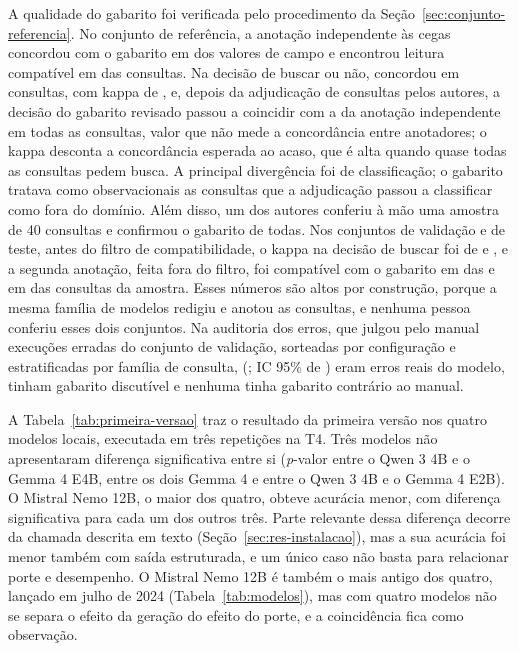 A qualidade do gabarito foi verificada pelo procedimento da Seção~\ref{sec:conjunto-referencia}. No conjunto de referência, a anotação independente às cegas concordou com o gabarito em  dos valores de campo e encontrou leitura compatível em  das  consultas. Na decisão de buscar ou não, concordou em  consultas, com kappa de , e, depois da adjudicação de  consultas pelos autores, a decisão do gabarito revisado passou a coincidir com a da anotação independente em todas as consultas, valor que não mede a concordância entre anotadores; o kappa desconta a concordância esperada ao acaso, que é alta quando quase todas as consultas pedem busca. A principal divergência foi de classificação; o gabarito tratava como observacionais as  consultas que a adjudicação passou a classificar como fora do domínio. Além disso, um dos autores conferiu à mão uma amostra de 40 consultas e confirmou o gabarito de todas. Nos conjuntos de validação e de teste, antes do filtro de compatibilidade, o kappa na decisão de buscar foi de  e , e a segunda anotação, feita fora do filtro, foi compatível com o gabarito em  das  e em  das  consultas da amostra. Esses números são altos por construção, porque a mesma família de modelos redigiu e anotou as consultas, e nenhuma pessoa conferiu esses dois conjuntos. Na auditoria dos erros, que julgou pelo manual  execuções erradas do conjunto de validação, sorteadas por configuração e estratificadas por família de consulta,  (; IC 95\% de ) eram erros reais do modelo,  tinham gabarito discutível e nenhuma tinha gabarito contrário ao manual.

A Tabela~\ref{tab:primeira-versao} traz o resultado da primeira versão nos quatro modelos locais, executada em três repetições na T4. Três modelos não apresentaram diferença significativa entre si (\textit{p}-valor  entre o Qwen 3 4B e o Gemma 4 E4B,  entre os dois Gemma 4 e  entre o Qwen 3 4B e o Gemma 4 E2B). O Mistral Nemo 12B, o maior dos quatro, obteve acurácia menor, com diferença significativa para cada um dos outros três. Parte relevante dessa diferença decorre da chamada descrita em texto (Seção~\ref{sec:res-instalacao}), mas a sua acurácia foi menor também com saída estruturada, e um único caso não basta para relacionar porte e desempenho. O Mistral Nemo 12B é também o mais antigo dos quatro, lançado em julho de 2024 (Tabela~\ref{tab:modelos}), mas com quatro modelos não se separa o efeito da geração do efeito do porte, e a coincidência fica como observação.

